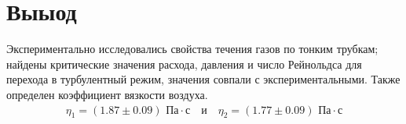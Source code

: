 \documentclass[a4paper, 12pt]{article}
\begin{document}
\section{Выыод} 
Экспериментально исследовались свойства течения газов по тонким трубкам; найдены критические значения расхода, давления и число Рейнольдса для перехода в турбулентный режим, значения совпали с экспериментальными. Также
	определен коэффициент вязкости воздуха.
	\begin{align}
		\eta_1 = (1.87\pm 0.09)\text{ Па}\cdot\text{с} \quad \text{и} \quad \eta_2 = (1.77\pm 0.09)\text{ Па}\cdot\text{с}
	\end{align}
	
\end{document}
